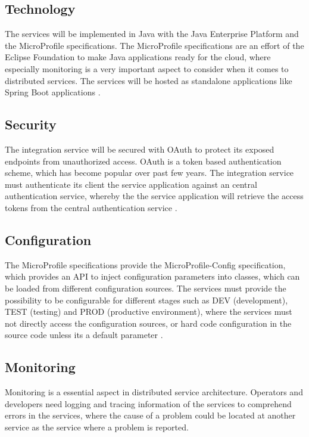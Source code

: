 \subsection{Technology}
\label{sec:esboc-requirements-service-technology}
The services will be implemented in Java with the Java Enterprise Platform and the MicroProfile specifications. The MicroProfile specifications are an effort of the Eclipse Foundation to make Java applications ready for the cloud, where especially monitoring is a very important aspect to consider when it comes to distributed services. The services will be hosted as standalone applications like Spring Boot applications \cite{EclipseMicroprofileCharter2017, EclipseEE4JCharter2017}.

\subsection{Security}
\label{sec:esboc-requirements-service-security}
The integration service will be secured with OAuth to protect its exposed endpoints from unauthorized access. OAuth is a token based authentication scheme, which has become popular over past few years. The  integration service must authenticate its client the service application against an central authentication service, whereby the the service application will retrieve the access tokens from the central authentication service \cite{OAuth2018}.

\subsection{Configuration}
\label{sec:esboc-requirements-service-config}
The MicroProfile specifications provide the MicroProfile-Config specification, which provides an API to inject configuration parameters into classes, which can be loaded from different configuration sources. The services must provide the possibility to be configurable for different stages such as DEV (development), TEST (testing) and PROD (productive environment), where the services must not directly access the configuration sources, or hard code configuration in the source code unless its a default parameter \cite{EclipseMicroprofileConfig2018}.

\subsection{Monitoring}
\label{sec:esboc-requirements-service-monitoring}
Monitoring is a essential aspect in distributed service architecture. Operators and developers need logging and tracing information of the services to comprehend errors in the services, where the cause of a problem could be located at another service as the service where a problem is reported.

